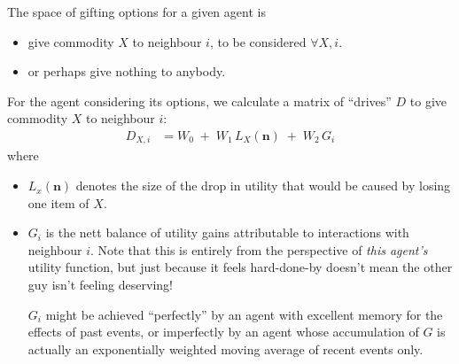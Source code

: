 \documentclass[11pt]{article}
\begin{document}
The space of gifting options for a given agent is 
\begin{itemize}
\item give commodity $X$ to neighbour $i$, to be considered $\forall X, i$.
\item or perhaps give nothing to anybody.
\end{itemize}

For the agent considering its options, 
we calculate a matrix of ``drives'' $D$ to give commodity $X$ to neighbour $i$:
\begin{align*}
D_{X,i} &= W_{0} \; + \; W_{1} \, L_{X}(\mathbf{n}) \; + \; W_{2} \, G_{i}
\end{align*}
where 
\begin{itemize}
\item $L_{x}(\mathbf{n})$ denotes the size of the drop in utility that would be caused by losing one item of $X$.
\item $G_{i}$ is the nett balance of utility gains attributable to interactions with neighbour $i$. Note that this is entirely from the perspective of {\it this agent's} utility function, but just because it feels hard-done-by doesn't mean the other guy isn't feeling deserving!

  $G_{i}$ might be achieved ``perfectly'' by an agent with excellent
  memory for the effects of past events, or imperfectly by an agent
  whose accumulation of $G$ is actually an exponentially weighted
  moving average of recent events only.
\end{itemize}
\end{document}
